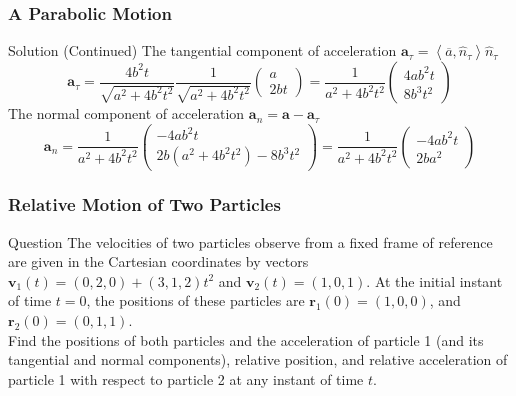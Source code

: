 \begin{frame}
\frametitle{A Parabolic Motion}
\begin{block}{Solution (Continued)}
The \alert{tangential} component of acceleration $\mathbf{a}_\tau=\left<\overline{a},\hat n_\tau\right>\hat n_\tau$ \[\mathbf{a}_\tau=\frac{4b^2t}{\sqrt{a^2+4b^2t^2}}\frac{1}{\sqrt{a^2+4b^2t^2}}\left(\begin{matrix}a\\2bt\end{matrix}\right)=\frac{1}{a^2+4b^2t^2}\left(\begin{matrix}4ab^2t\\8b^3t^2\end{matrix}\right)\]
The \alert{normal} component of acceleration $\mathbf{a}_n=\mathbf{a}-\mathbf{a}_\tau$
\[
\mathbf{a}_n=\frac{1}{a^2+4b^2t^2}\left(\begin{matrix}-4ab^2t\\2b(a^2+4b^2t^2)-8b^3t^2\end{matrix}\right)=\frac{1}{a^2+4b^2t^2}\left(\begin{matrix}-4ab^2t\\2ba^2\end{matrix}\right)
\]
\end{block}
\end{frame}
\begin{frame}
\frametitle{Relative Motion of Two Particles}
\begin{block}{Question}
The \alert{velocities} of two particles observe from a \alert{fixed frame of reference} are given in the Cartesian coordinates by vectors $\mathbf{v}_1(t)=(0,2,0)+(3,1,2)t^2$ and $\mathbf{v}_2(t)=(1,0,1)$. At the \alert{initial} instant of time $t=0$, the positions of these particles are $\mathbf{r}_1(0)=(1,0,0)$, and $\mathbf{r}_2(0)=(0,1,1)$.\\
Find the \alert{positions} of both particles and the \alert{acceleration} of particle 1 (and its tangential and normal components), \alert{relative position}, and \alert{relative acceleration} of particle 1 with respect to particle 2 at any instant of time 
$t$.
\end{block}
\end{frame}
